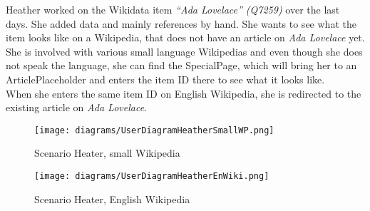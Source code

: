 Heather worked on the Wikidata item \textit{``Ada Lovelace'' (Q7259)} over the last days. She added data and mainly references by hand. She wants to see what the item looks like on a Wikipedia, that does not have an article on \textit{Ada Lovelace} yet. \\
She is involved with various small language Wikipedias and even though she does not speak the language, she can find the SpecialPage, which will bring her to an ArticlePlaceholder and enters the item ID there to see what it looks like. \\
When she enters the same item ID on English Wikipedia, she is redirected to the existing article on \textit{Ada Lovelace}.
\begin{figure}[H]
	\centering
	\texttt{[image: diagrams/UserDiagramHeatherSmallWP.png]}
	\caption{Scenario Heater, small Wikipedia}
	\label{fig:ScenarioHeatherSmall}
\end{figure}
\begin{figure}[H]
	\centering
	\texttt{[image: diagrams/UserDiagramHeatherEnWiki.png]}
	\caption{Scenario Heater, English Wikipedia}
	\label{fig:ScenarioHeatherEnWiki}
\end{figure}